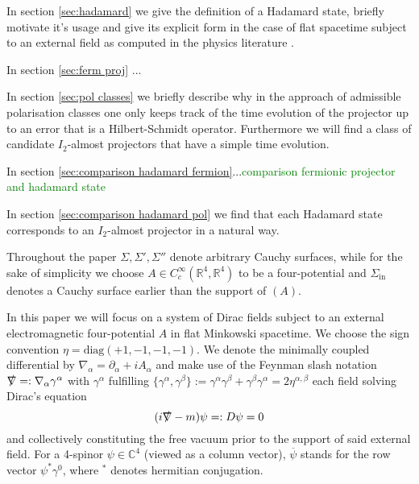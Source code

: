 \documentclass[a4paper,11pt]{article}
\begin{document}
In section \ref{sec:hadamard} we give the definition of a Hadamard state, briefly motivate it's usage 
and give its explicit form in the case of flat spacetime subject to an external field as computed in the physics literature \cite{schlemmer2015current}.

In section \ref{sec:ferm proj} ...

In section \ref{sec:pol classes} we briefly describe why in the approach of admissible polarisation classes one only keeps track of the time
evolution of the projector up to an error that is a Hilbert-Schmidt operator. Furthermore we will find a class of candidate \(I_2\)-almost projectors
that have a simple time evolution.

In section \ref{sec:comparison hadamard fermion}...\textcolor{green}{comparison fermionic projector and hadamard state}

In section \ref{sec:comparison hadamard pol} we find that each Hadamard state corresponds to an \(I_2\)-almost projector in a natural way.

Throughout the paper
\(\Sigma, \Sigma', \Sigma''\) denote arbitrary Cauchy surfaces, while for the sake of simplicity we choose \(A\in C_c^\infty(\mathbb{R}^4,\mathbb{R}^4)\) 
to be a four-potential and \(\Sigma_{\text{in}}\) denotes a Cauchy surface earlier than the support of \((A)\).

In this paper we will focus on a system of Dirac fields subject to an external electromagnetic four-potential \(A\) in flat Minkowski spacetime.
We choose the sign convention \(\eta=\text{diag}(+1,-1,-1,-1)\). We denote the minimally coupled differential by \(\nabla_{\alpha} = \partial_{\alpha} + i A_{\alpha}\)
and make use of the Feynman slash notation \(\slashed{\nabla}=:\nabla_{\alpha}\gamma^\alpha\) with \(\gamma^\alpha\) fulfilling 
\(\{\gamma^\alpha , \gamma^\beta\}:=\gamma^\alpha  \gamma^\beta+\gamma^\beta  \gamma^\alpha  = 2 \eta^{\alpha,\beta}\)  each field solving 
Dirac's equation
\begin{equation}\label{dirac}
(i\slashed{\nabla}-m)\psi =: D\psi= 0
\end{equation}
and collectively constituting the free vacuum prior to the support of said external field.
For a 4-spinor \(\psi\in\mathbb{C}^4\) (viewed as a column vector), \(\overline{\psi}\) stands for the row vector \(\psi^*\gamma^0\), where \({}^*\) denotes hermitian conjugation.
\end{document}
